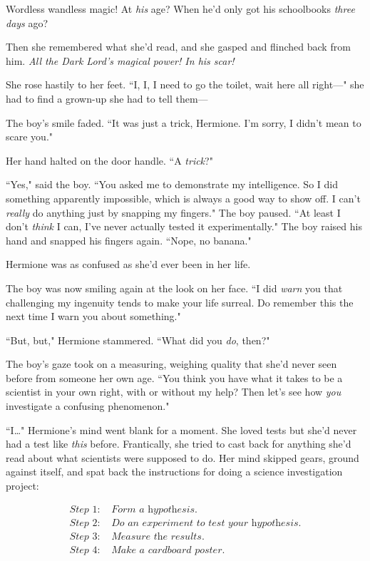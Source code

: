 Wordless wandless magic! At \emph{his} age? When he'd only got his schoolbooks \emph{three days} ago?

Then she remembered what she'd read, and she gasped and flinched back from him. \emph{All the Dark Lord's magical power! In his scar!}

She rose hastily to her feet. ``I, I, I need to go the toilet, wait here all right—" she had to find a grown-up she had to tell them—

The boy's smile faded. ``It was just a trick, Hermione. I'm sorry, I didn't mean to scare you."

Her hand halted on the door handle. ``A \emph{trick}?"

``Yes," said the boy. ``You asked me to demonstrate my intelligence. So I did something apparently impossible, which is always a good way to show off. I can't \emph{really} do anything just by snapping my fingers." The boy paused. ``At least I don't \emph{think} I can, I've never actually tested it experimentally." The boy raised his hand and snapped his fingers again. ``Nope, no banana."

Hermione was as confused as she'd ever been in her life.

The boy was now smiling again at the look on her face. ``I did \emph{warn} you that challenging my ingenuity tends to make your life surreal. Do remember this the next time I warn you about something."

``But, but," Hermione stammered. ``What did you \emph{do}, then?"

The boy's gaze took on a measuring, weighing quality that she'd never seen before from someone her own age. ``You think you have what it takes to be a scientist in your own right, with or without my help? Then let's see how \emph{you} investigate a confusing phenomenon."

``I{\ldots}" Hermione's mind went blank for a moment. She loved tests but she'd never had a test like \emph{this} before. Frantically, she tried to cast back for anything she'd read about what scientists were supposed to do. Her mind skipped gears, ground against itself, and spat back the instructions for doing a science investigation project:

\begin{align*}
\textit{Step 1:}&\textit{ Form a hypothesis.}\\
\textit{Step 2:}&\textit{ Do an experiment to test your hypothesis.}\\
\textit{Step 3:}&\textit{ Measure the results.}\\
\textit{Step 4:}&\textit{ Make a cardboard poster.}
\end{align*}

